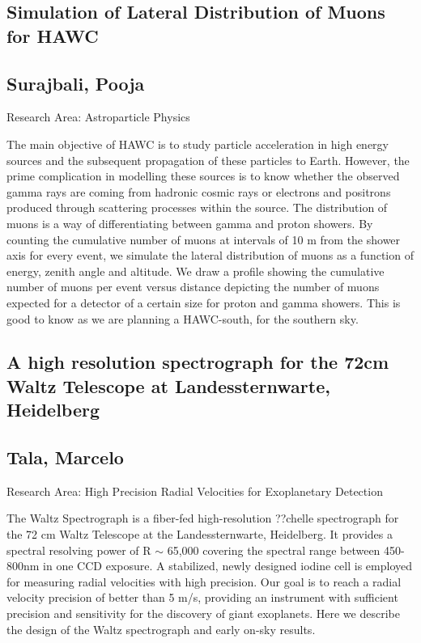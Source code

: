 \subsection*{\centering \large Simulation of Lateral Distribution of Muons for HAWC}
\subsection*{\centering \normalsize Surajbali, Pooja}
Research Area: Astroparticle Physics\newline

\noindent The main objective of HAWC is to study particle acceleration in high energy sources and the subsequent propagation of these particles to Earth. However, the prime complication in modelling these sources is to know whether the observed gamma rays are coming from hadronic cosmic rays or electrons and positrons produced through scattering processes within the source. The distribution of muons is a way of differentiating between gamma and proton showers. By counting the cumulative number of muons at intervals of 10 m from the shower axis for every event, we simulate the lateral distribution of muons as a function of energy, zenith angle and altitude. We draw a profile showing the cumulative number of muons per event versus distance depicting the number of muons expected for a detector of a certain size for proton and gamma showers. This is good to know as we are planning a HAWC-south, for the southern sky.

\subsection*{\centering \large A high resolution spectrograph for the 72cm Waltz Telescope at Landessternwarte, Heidelberg}
\subsection*{\centering \large Tala, Marcelo}
Research Area:  High Precision Radial Velocities for Exoplanetary Detection \newline 

\noindent The Waltz Spectrograph is a fiber-fed high-resolution ??chelle spectrograph for the 72 cm Waltz Telescope at the Landessternwarte, Heidelberg. It provides a spectral resolving power of R $\sim$ 65,000 covering the spectral range between 450-800nm in one CCD exposure. A stabilized, newly designed iodine cell is employed for measuring radial velocities with high precision. Our goal is to reach a radial velocity precision of better than 5 m/s, providing an instrument with sufficient precision and sensitivity for the discovery of giant exoplanets. Here we describe the design of the Waltz spectrograph and early on-sky results.
\newpage
